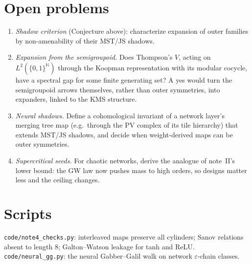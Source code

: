 \documentclass[11pt]{article}
\theoremstyle{definition}
\theoremstyle{remark}
\newcommand{\N}{\mathbb N}
\begin{document}
\section{Open problems}
\begin{enumerate}
\item \emph{Shadow criterion} (Conjecture above): characterize expansion of outer families by non-amenability of their MST/JS shadows.
\item \emph{Expansion from the semigroupoid.} Does Thompson's $V$, acting on $L^2(\{0,1\}^{\N})$ through the Koopman representation with its modular cocycle, have a spectral gap for some finite generating set? A yes would turn the semigroupoid arrows themselves, rather than outer symmetries, into expanders, linked to the KMS structure.
\item \emph{Neural shadows.} Define a cohomological invariant of a network layer's merging tree map (e.g.\ through the PV complex of its tile hierarchy) that extends MST/JS shadows, and decide when weight-derived maps can be outer symmetries.
\item \emph{Supercritical seeds.} For chaotic networks, derive the analogue of note~II's lower bound: the GW law now pushes mass to high orders, so designs matter less and the ceiling changes.
\end{enumerate}

\appendix
\section{Scripts}
\texttt{code/note4\_checks.py}: interleaved maps preserve all cylinders; Sanov relations absent to length $8$; Galton--Watson leakage for tanh and ReLU. \texttt{code/neural\_gg.py}: the neural Gabber--Galil walk on network $\varepsilon$-chain classes.
\end{document}
